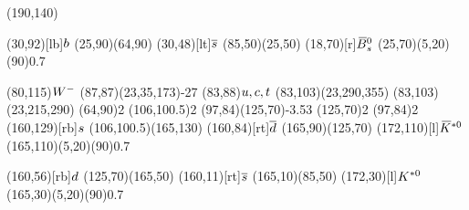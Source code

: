 \documentclass{standalone}
\begin{document}
\begin{axopicture}(190,140)

  \Text(30,92)[lb]{${b}$}                     %
  \Line[arrow](25,90)(64,90)                      %
  \Text(30,48)[lt]{${\overline {{s}}}$}                  %
  \Line[arrow](85,50)(25,50)                      %
  \Text(18,70)[r]{${{\kern 0.18em\overline{\kern -0.18em B}}{}^0_{s}}$}                         %
  \GOval(25,70)(5,20)(90){0.7}                    %
                                                  
  \Text(80,115){\small{${W^-}$}}                    %
  \PhotonArc(87,87)(23,35,173){-2}{7}             %
  \Text(83,88){${u}, {c}, {t}$}       %
  \Arc[arrow,arrowpos=0.60](83,103)(23,290,355)   %
  \Arc[arrow,arrowpos=0.60](83,103)(23,215,290)   %
  \Vertex(64,90){2}                               %
  \Vertex(106,100.5){2}                           %
  \Gluon(97,84)(125,70){-3.5}{3}                  %
  \Vertex(125,70){2}                              %
  \Vertex(97,84){2}                               %
  \Text(160,129)[rb]{${s}$}                   %
  \Line[arrow](106,100.5)(165,130)                %
  \Text(160,84)[rt]{${\overline {{d}}}$}                 %
  \Line[arrow](165,90)(125,70)                    %
  \Text(172,110)[l]{${{\kern 0.18em\overline{\kern -0.18em K}}{}^{*0}}$}                   %
  \GOval(165,110)(5,20)(90){0.7}                  %
                                                  
  \Text(160,56)[rb]{${d}$}                    %
  \Line[arrow](125,70)(165,50)                    %
  \Text(160,11)[rt]{${\overline {{s}}}$}                 %
  \Line[arrow](165,10)(85,50)                     %
  \Text(172,30)[l]{${{K}^{*0}}$}                     %
  \GOval(165,30)(5,20)(90){0.7}                   %
                                                  
\end{axopicture}
\end{document}
